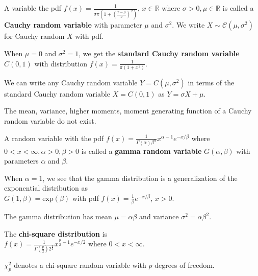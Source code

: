 \begin{defn}
    A variable the pdf $f(x) = \displaystyle \frac{1}{\sigma \pi (1 + \left( \frac{x - \mu}{\sigma} \right)^2 )}$, $x \in \mathbb{R}$ where $\sigma > 0, \mu \in \mathbb{R}$ is called a \textbf{Cauchy random variable} with parameter $\mu$ and $\sigma^2$.
    We write $X \sim \mathcal{C}(\mu, \sigma^2)$ for Cauchy random $X$ with pdf.
\end{defn}

\begin{defn}
    When $\mu = 0$ and $\sigma^2 = 1$, we get the \textbf{standard Cauchy random variable} $C(0,1)$ with distribution $f(x) = \displaystyle \frac{1}{\pi (1 + x^2)}$.
\end{defn}

We can write any Cauchy random variable $Y = C(\mu, \sigma^2)$ in terms of the standard Cauchy random variable $X = C(0,1)$ as $Y = \sigma X + \mu$.

\begin{prop}
The mean, variance, higher moments, moment generating function of a Cauchy random variable do not exist.
\end{prop}

\begin{defn}
    A random variable with the pdf $f(x) = \displaystyle  \frac{1}{\Gamma(\alpha) \beta^\alpha} x^{\alpha - 1} e^{-x/\beta}$ where $0 < x < \infty, \alpha > 0, \beta > 0$ is called a \textbf{gamma random variable} $G(\alpha, \beta)$ with parameters $\alpha$ and $\beta$.
\end{defn}
\begin{prop}
    When $\alpha=1$, we see that the gamma distribution is a generalization of the exponential distribution as \\
$G(1, \beta) = \text{exp}(\beta)$ with pdf $f(x) = \frac{1}{\beta} e^{-x/\beta}$, $x > 0$.
\end{prop}

\begin{prop}
The gamma distribution has mean $\mu = \alpha \beta$ and variance $\sigma^2 = \alpha \beta^2$.
\end{prop}

\begin{defn}
    The \textbf{chi-square distribution} is \\
    $f(x) = \displaystyle \frac{1}{\Gamma(\frac{p}{2}) 2^{\frac{p}{2}}} x^{\frac{p}{2} - 1} e ^{-x/2}$ where $0 < x < \infty$.

    \vspace{0.5cm}
    $\chi_p^2$ denotes a chi-square random variable with $p$ degrees of freedom.
\end{defn}

